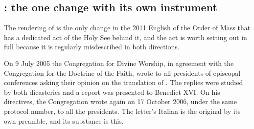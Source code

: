 \subsection{: the one change with its own instrument}

The rendering of  is the only change in the 2011 English of the Order of Mass
that has a dedicated act of the Holy See behind it, and the act is worth setting out in full
because it is regularly misdescribed in both directions.

On 9 July 2005 the Congregation for Divine Worship, in agreement with the Congregation for the
Doctrine of the Faith, wrote to all presidents of episcopal conferences asking their opinion on
the translation of . The replies were studied by both dicasteries and a report
was presented to Benedict XVI. On his directives, the Congregation wrote again on 17 October
2006, under the same protocol number, to all the presidents. The letter's Italian is the
original by its own preamble, and its substance is this.

